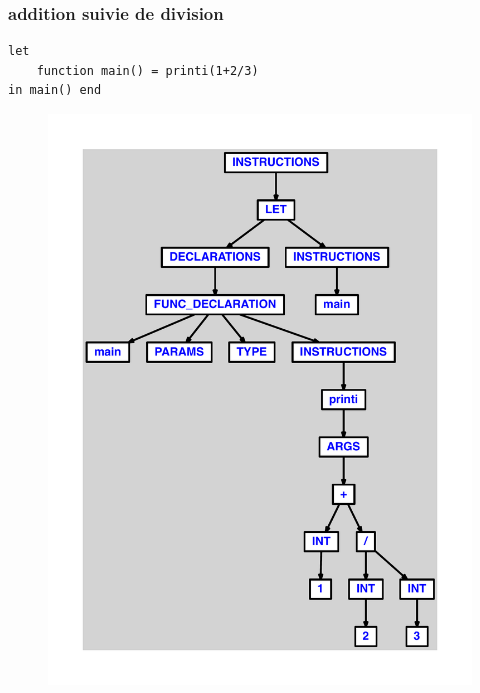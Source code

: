 \documentclass{article}
\begin{document}
\subsubsection{addition suivie de division}
\begin{lstlisting}
let
	function main() = printi(1+2/3)
in main() end
\end{lstlisting}
\newpage
\begin{figure}[H]
\centering
\includegraphics[max width=\textwidth]{ast/ast_46.pdf}
\end{figure}
\newpage
\end{document}
